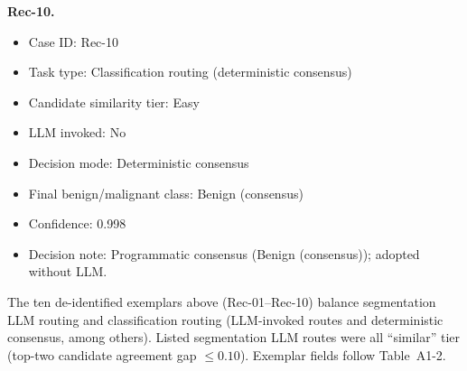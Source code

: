 \noindent\textbf{Rec-10.}\par
\begin{itemize}[leftmargin=1.5em,topsep=0.1em,itemsep=0.05em]
\item Case ID: Rec-10
\item Task type: Classification routing (deterministic consensus)
\item Candidate similarity tier: Easy
\item LLM invoked: No
\item Decision mode: Deterministic consensus
\item Final benign/malignant class: Benign (consensus)
\item Confidence: 0.998
\item Decision note: Programmatic consensus (Benign (consensus)); adopted without LLM.
\end{itemize}
\par\smallskip\noindent\footnotesize The ten de-identified exemplars above (Rec-01--Rec-10) balance segmentation LLM routing and classification routing (LLM-invoked routes and deterministic consensus, among others). Listed segmentation LLM routes were all ``similar'' tier (top-two candidate agreement gap $\leq 0.10$). Exemplar fields follow Table~A1-2.
